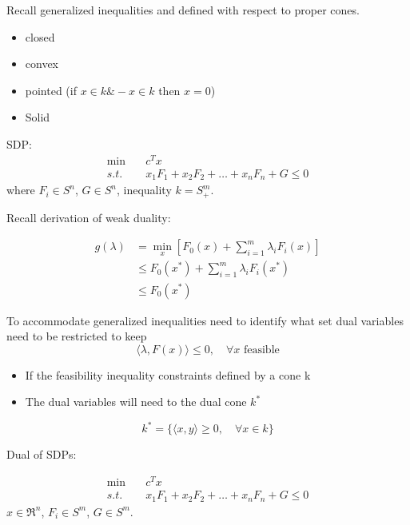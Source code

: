Recall generalized inequalities and defined with respect to proper cones.

\begin{itemize}
	\item closed
	
	\item convex
	
	\item pointed (if $x\in k \& -x\in k$ then $x=0$)
	
	\item Solid
\end{itemize}

SDP:
\begin{align*}
\min\quad &c^Tx\\
s.t.\quad &x_1F_1+x_2F_2+\ldots+x_nF_n+G\leq 0
\end{align*}
where $F_i\in S^n$, $G\in S^n$, inequality $k=S^m_+$.


Recall derivation of weak duality:

\begin{align*}
g(\lambda) &= \min_x[F_0(x) + \sum^m_{i=1}\lambda_iF_i(x)]\\
&\leq F_0(x^*) + \sum^m_{i=1}\lambda_i F_i(x^*) \\
&\leq F_0(x^*)
\end{align*}

To accommodate generalized inequalities need to identify what set dual variables need to be restricted to keep
\begin{equation*}
\langle \lambda, F(x)\rangle\leq 0,\quad \forall x \text{ feasible}
\end{equation*}



\begin{itemize}
	\item If the feasibility inequality constraints defined by a cone k
	
	\item The dual variables will need to the dual cone $k^*$
\end{itemize}

\begin{equation*}
k^*=\{\langle x,y\rangle \geq 0, \quad \forall x\in k \}
\end{equation*}

Dual of SDPs:

\begin{align*}
\min\quad &c^Tx\\
s.t.\quad &x_1F_1+x_2F_2+\ldots+x_nF_n+G\leq 0
\end{align*}
$x\in \Re^n$, $F_i\in S^m$, $G\in S^m$.

